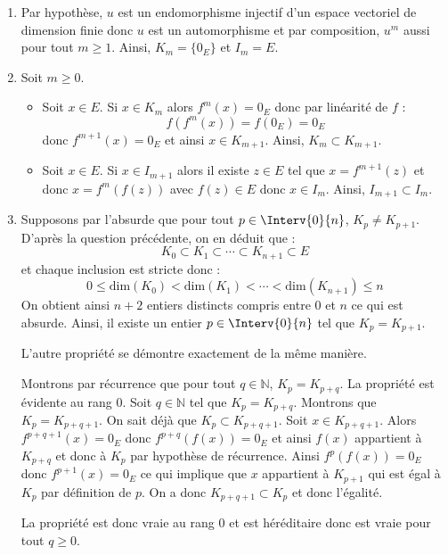 \documentclass[a4paper,10pt]{report}
\begin{document}
\corr \begin{enumerate}
\item Par hypothèse, $u$ est un endomorphisme injectif d'un espace vectoriel de dimension finie donc $u$ est un automorphisme et par composition, $u^m$ aussi pour tout $m \geq 1$. Ainsi, $K_m =\lbrace 0_E \rbrace$ et $I_m = E$.
\item Soit $m \geq 0$.
\begin{itemize}
\item Soit $x \in E$. Si $x \in K_m$ alors $f^m(x)=0_E$ donc par linéarité de $f$ :
$$ f(f^m(x))=f(0_E)=0_E$$
donc $f^{m+1}(x)=0_E$ et ainsi $x \in K_{m+1}$. Ainsi, $K_m \subset K_{m+1}$.
\item Soit $x \in E$. Si $x \in I_{m+1}$ alors il existe $z \in E$ tel que $x = f^{m+1}(z)$ et donc $x= f^m(f(z))$ avec $f(z) \in E$ donc $x \in I_m$. Ainsi, $I_{m+1} \subset I_m$.
\end{itemize}

\item Supposons par l'absurde que pour tout $p \in \Interv{0}{n}$, $K_p \neq K_{p+1}$. D'après la question précédente, on en déduit que :
$$ K_0 \subset K_1 \subset \cdots \subset K_{n+1} \subset E$$
et chaque inclusion est stricte donc :
$$ 0 \leq \textrm{dim}(K_0) < \textrm{dim}(K_1) < \cdots < \textrm{dim}(K_{n+1}) \leq n$$
On obtient ainsi $n+2$ entiers distincts compris entre $0$ et $n$ ce qui est absurde. Ainsi, il existe un entier $p \in \Interv{0}{n}$ tel que $K_p=K_{p+1}$. 

\medskip

\noindent L'autre propriété se démontre exactement de la même manière.

\medskip

\noindent Montrons par récurrence que pour tout $q \in \mathbb{N}$, $K_p = K_{p+q}$. La propriété est évidente au rang $0$. Soit $q \in \mathbb{N}$ tel que $K_p= K_{p+q}$. Montrons que $K_p=K_{p+q+1}$. On sait déjà que $K_p \subset K_{p+q+1}$. Soit $x \in  K_{p+q+1}$. Alors $f^{p+q+1}(x)=0_E$ donc $f^{p+q}(f(x))=0_E$ et ainsi $f(x)$ appartient à $K_{p+q}$ et donc à $K_p$ par hypothèse de récurrence. Ainsi $f^{p}(f(x))=0_E$ donc $f^{p+1}(x)=0_E$ ce qui implique que $x$ appartient à $K_{p+1}$ qui est égal à $K_p$ par définition de $p$. On a donc $K_{p+q+1} \subset K_p$ et donc l'égalité.

\medskip

\noindent La propriété est donc vraie au rang $0$ et est héréditaire donc est vraie pour tout $q \geq 0$.


\end{enumerate}
\end{document}
